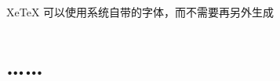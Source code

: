 \documentclass[11pt,a4paper]{article}
\begin{document}
    \tableofcontents  
    \section{\XeLaTeX}  
    XeTeX 可以使用系统自带的字体，而不需要再另外生成
    \section{……}  
    
\end{document}
